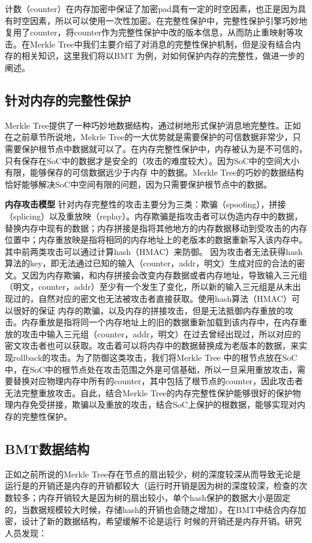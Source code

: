 计数（counter）在内存加密中保证了加密pad具有一定的时空因素，也正是因为具有时空因素，所以可以使用一次性加密。在完整性保护中，完整性保护引擎巧妙地复用了counter，将counter作为完整性保护中改的版本信息，从而防止重映射等攻击。在Merkle Tree中我们主要介绍了对消息的完整性保护机制，但是没有结合内存的相关知识，这里我们将以BMT
为例，对如何保护内存的完整性，做进一步的阐述。

\subsection{针对内存的完整性保护}
Merkle Tree提供了一种巧妙地数据结构，通过树地形式保护消息地完整性。正如在之前章节所说地，Mekrle Tree的一大优势就是需要保护的可信数据非常少，只需要保护根节点中数据就可以了。在内存完整性保护中，内存被认为是不可信的，只有保存在SoC中的数据才是安全的（攻击的难度较大）。因为SoC中的空间大小有限，能够保存的可信数据远少于内存
中的数据。Merkle Tree的巧妙的数据结构恰好能够解决SoC中空间有限的问题，因为只需要保护根节点中的数据。

\textbf{内存攻击模型}
针对内存完整性的攻击主要分为三类：欺骗（spoofing），拼接（splicing）以及重放映（replay）。内存欺骗是指攻击者可以伪造内存中的数据，替换内存中现有的数据；内存拼接是指将其他地方的内存数据移动到受攻击的内存位置中；内存重放映是指将相同的内存地址上的老版本的数据重新写入该内存中。其中前两类攻击可以通过计算hash（HMAC）来防御。
因为攻击者无法获得hash算法的key，即无法通过已知的输入（counter，addr，明文）生成对应的合法的密文。又因为内存欺骗，和内存拼接会改变内存数据或者内存地址，导致输入三元组（明文，counter，addr）至少有一个发生了变化，所以新的输入三元组是从未出现过的，自然对应的密文也无法被攻击者直接获取。使用hash算法（HMAC）可以很好的保证
内存的欺骗，以及内存的拼接攻击，但是无法抵御内存重放的攻击。内存重放是指将同一个内存地址上的旧的数据重新加载到该内存中，在内存重放的攻击中输入三元组（counter，addr，明文）在过去曾经出现过，所以对应的密文攻击者也可以获取。攻击着可以将内存中的数据替换成为老版本的数据，来实现rollback的攻击。为了防御这类攻击，我们将Merkle Tree
中的根节点放在SoC中，在SoC中的根节点处在攻击范围之外是可信基础，所以一旦采用重放攻击，需要替换对应物理内存中所有的counter，其中包括了根节点的counter，因此攻击者无法完整重放攻击。自此，结合Merkle Tree的内存完整性保护能够很好的保护物理内存免受拼接，欺骗以及重放的攻击，结合SoC上保护的根数据，能够实现对内存的完整性保护。

\subsection{BMT数据结构}
正如之前所说的Merkle Tree存在节点的扇出较少，树的深度较深从而导致无论是运行是的开销还是内存的开销都较大（运行时开销是因为树的深度较深，检查的次数较多；内存开销较大是因为树的扇出较小，单个hash保护的数据大小是固定的，当数据规模较大时候，存储hash的开销也会随之增加）。在BMT中结合内存加密，设计了新的数据结构，希望缓解不论是运行
时候的开销还是内存开销。研究人员发现：

